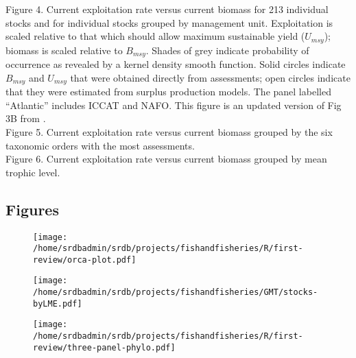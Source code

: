 \noindent Figure 4. Current exploitation rate versus current biomass
for 213 individual stocks and for individual stocks grouped by
management unit. Exploitation is scaled relative to that which should
allow maximum sustainable yield ($U_{msy}$); biomass is scaled
relative to $B_{msy}$. Shades of grey indicate probability of
occurrence as revealed by a kernel density smooth function. Solid
circles indicate $B_{msy}$ and $U_{msy}$ that were obtained directly
from assessments; open circles indicate that they were estimated from
surplus production models. The panel labelled ``Atlantic'' includes
ICCAT and NAFO. This figure is an updated version of Fig 3B from
\citet{Worm:etal:2009:science}.
\\

\noindent Figure 5. Current exploitation rate versus current biomass grouped by the six taxonomic orders with the most assessments.
\\

\noindent Figure 6. Current exploitation rate versus current biomass grouped by mean trophic level.
\\

\newpage
\subsection*{Figures}

\begin{landscape}
\begin{figure}
\begin{center}
\texttt{[image: /home/srdbadmin/srdb/projects/fishandfisheries/R/first-review/orca-plot.pdf]}
\end{center}
\caption{ }\label{fig:orca}
\end{figure}
\end{landscape}

\begin{landscape}
\begin{figure}
\begin{center}
\texttt{[image: /home/srdbadmin/srdb/projects/fishandfisheries/GMT/stocks-byLME.pdf]}
\end{center}
\caption{ }\label{fig:lmes}
\end{figure}
\end{landscape}


\begin{figure}
\begin{center}
\texttt{[image: /home/srdbadmin/srdb/projects/fishandfisheries/R/first-review/three-panel-phylo.pdf]} %
\end{center}
\caption{ }\label{fig:taxo:threepanel}
\end{figure}




